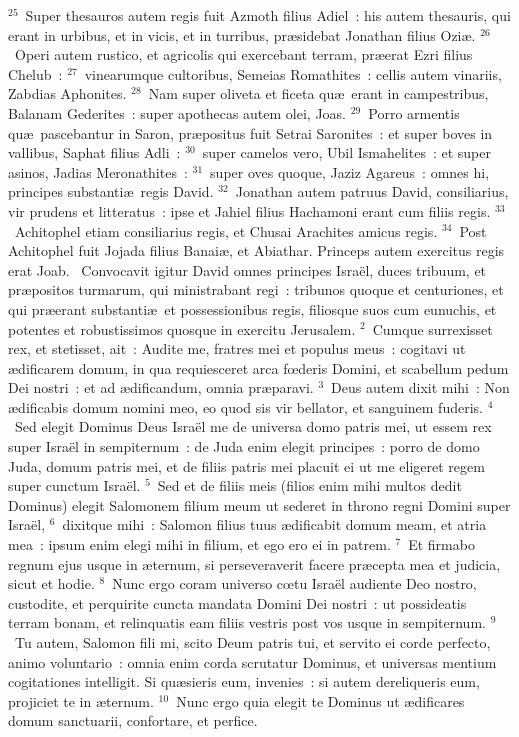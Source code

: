 ${}^{25}$~Super thesauros autem regis fuit Azmoth filius Adiel~: his autem thesauris, qui erant in urbibus, et in vicis, et in turribus, pr\ae sidebat Jonathan filius Ozi\ae .
${}^{26}$~Operi autem rustico, et agricolis qui exercebant terram, pr\ae erat Ezri filius Chelub~:
${}^{27}$~vinearumque cultoribus, Semeias Romathites~: cellis autem vinariis, Zabdias Aphonites.
${}^{28}$~Nam super oliveta et ficeta qu\ae\ erant in campestribus, Balanam Gederites~: super apothecas autem olei, Joas.
${}^{29}$~Porro armentis qu\ae\ pascebantur in Saron, pr\ae positus fuit Setrai Saronites~: et super boves in vallibus, Saphat filius Adli~:
${}^{30}$~super camelos vero, Ubil Ismahelites~: et super asinos, Jadias Meronathites~:
${}^{31}$~super oves quoque, Jaziz Agareus~: omnes hi, principes substanti\ae\ regis David.
${}^{32}$~Jonathan autem patruus David, consiliarius, vir prudens et litteratus~: ipse et Jahiel filius Hachamoni erant cum filiis regis.
${}^{33}$~Achitophel etiam consiliarius regis, et Chusai Arachites amicus regis.
${}^{34}$~Post Achitophel fuit Jojada filius Banai\ae , et Abiathar. Princeps autem exercitus regis erat Joab.
~Convocavit igitur David omnes principes Isra\"el, duces tribuum, et pr\ae positos turmarum, qui ministrabant regi~: tribunos quoque et centuriones, et qui pr\ae erant substanti\ae\ et possessionibus regis, filiosque suos cum eunuchis, et potentes et robustissimos quosque in exercitu Jerusalem.
${}^{2}$~Cumque surrexisset rex, et stetisset, ait~: Audite me, fratres mei et populus meus~: cogitavi ut \ae dificarem domum, in qua requiesceret arca fœderis Domini, et scabellum pedum Dei nostri~: et ad \ae dificandum, omnia pr\ae paravi.
${}^{3}$~Deus autem dixit mihi~: Non \ae dificabis domum nomini meo, eo quod sis vir bellator, et sanguinem fuderis.
${}^{4}$~Sed elegit Dominus Deus Isra\"el me de universa domo patris mei, ut essem rex super Isra\"el in sempiternum~: de Juda enim elegit principes~: porro de domo Juda, domum patris mei, et de filiis patris mei placuit ei ut me eligeret regem super cunctum Isra\"el.
${}^{5}$~Sed et de filiis meis (filios enim mihi multos dedit Dominus) elegit Salomonem filium meum ut sederet in throno regni Domini super Isra\"el,
${}^{6}$~dixitque mihi~: Salomon filius tuus \ae dificabit domum meam, et atria mea~: ipsum enim elegi mihi in filium, et ego ero ei in patrem.
${}^{7}$~Et firmabo regnum ejus usque in \ae ternum, si perseveraverit facere pr\ae cepta mea et judicia, sicut et hodie.
${}^{8}$~Nunc ergo coram universo cœtu Isra\"el audiente Deo nostro, custodite, et perquirite cuncta mandata Domini Dei nostri~: ut possideatis terram bonam, et relinquatis eam filiis vestris post vos usque in sempiternum.
${}^{9}$~Tu autem, Salomon fili mi, scito Deum patris tui, et servito ei corde perfecto, animo voluntario~: omnia enim corda scrutatur Dominus, et universas mentium cogitationes intelligit. Si qu\ae sieris eum, invenies~: si autem dereliqueris eum, projiciet te in \ae ternum.
${}^{10}$~Nunc ergo quia elegit te Dominus ut \ae dificares domum sanctuarii, confortare, et perfice.


